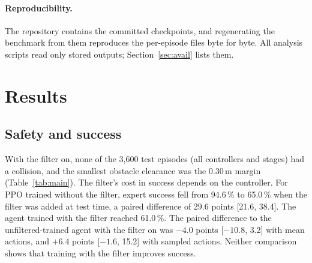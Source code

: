 \documentclass[11pt]{article}
\theoremstyle{definition}
\theoremstyle{remark}
\begin{document}
\paragraph{Reproducibility.} The repository contains the committed checkpoints, and regenerating the benchmark from them reproduces the per-episode files byte for byte. All analysis scripts read only stored outputs; Section~\ref{sec:avail} lists them.

\section{Results}\label{sec:results}
\subsection{Safety and success}
With the filter on, none of the 3{,}600 test episodes (all controllers and stages) had a collision, and the smallest obstacle clearance was the 0.30\,m margin (Table~\ref{tab:main}). The filter's cost in success depends on the controller. For PPO trained without the filter, expert success fell from 94.6\,\% to 65.0\,\% when the filter was added at test time, a paired difference of 29.6 points [21.6, 38.4]. The agent trained with the filter reached 61.0\,\%. The paired difference to the unfiltered-trained agent with the filter on was $-4.0$ points [$-10.8$, 3.2] with mean actions, and $+6.4$ points [$-1.6$, 15.2] with sampled actions. Neither comparison shows that training with the filter improves success.
\end{document}
